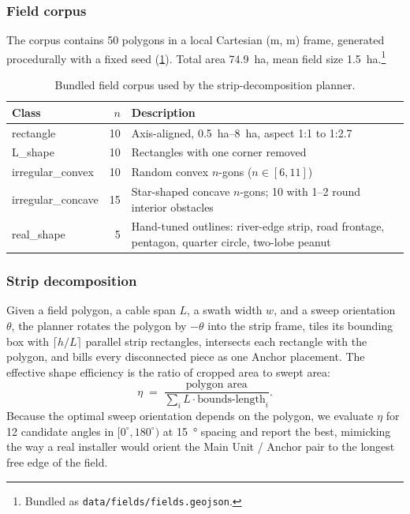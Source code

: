 \documentclass[11pt,a4paper]{article}
\begin{document}
\subsubsection{Field corpus}\label{sec:corpus}

The corpus contains 50 polygons in a local Cartesian (m, m) frame, generated procedurally with a fixed seed (\cref{tab:corpus}). Total area \SI{74.9}{\hectare}, mean field size \SI{1.5}{\hectare}.\footnote{Bundled as \texttt{data/fields/fields.geojson}.}

\begin{table}[H]
\centering\small
\caption{Bundled field corpus used by the strip-decomposition planner.}\label{tab:corpus}
\begin{tabularx}{\textwidth}{lrX}
\toprule
Class & $n$ & Description \\
\midrule
rectangle           & 10 & Axis-aligned, \SIrange{0.5}{8}{\hectare}, aspect 1:1 to 1:2.7 \\
L\_shape            & 10 & Rectangles with one corner removed \\
irregular\_convex   & 10 & Random convex $n$-gons ($n \in [6,11]$) \\
irregular\_concave  & 15 & Star-shaped concave $n$-gons; 10 with 1--2 round interior obstacles \\
real\_shape         & 5  & Hand-tuned outlines: river-edge strip, road frontage, pentagon, quarter circle, two-lobe peanut \\
\bottomrule
\end{tabularx}
\end{table}

\subsubsection{Strip decomposition}\label{sec:strip}

Given a field polygon, a cable span $L$, a swath width $w$, and a sweep orientation $\theta$, the planner rotates the polygon by $-\theta$ into the strip frame, tiles its bounding box with $\lceil h/L \rceil$ parallel strip rectangles, intersects each rectangle with the polygon, and bills every disconnected piece as one Anchor placement. The effective shape efficiency is the ratio of cropped area to swept area:
\begin{equation}\label{eq:eta-shape}
\eta \;=\; \frac{\text{polygon area}}{\sum_{i} L \cdot \text{bounds-length}_{i}}.
\end{equation}
Because the optimal sweep orientation depends on the polygon, we evaluate $\eta$ for 12 candidate angles in $[0^{\circ}, 180^{\circ})$ at \SI{15}{\degree} spacing and report the best, mimicking the way a real installer would orient the Main Unit / Anchor pair to the longest free edge of the field.
\end{document}

